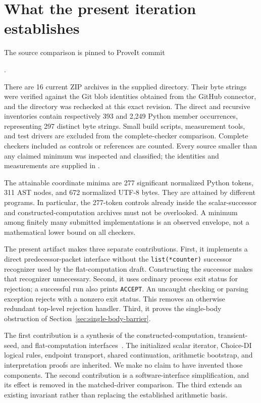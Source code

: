 \section{What the present iteration establishes}

The source comparison is pinned to ProveIt commit
\begin{center}\small
{}.
\end{center}
There are 16 current ZIP archives in the supplied directory. Their byte
strings were verified against the Git blob identities obtained from the
GitHub connector, and the directory was rechecked at this exact revision.
The direct and recursive inventories contain respectively 393 and 2,249
Python member occurrences, representing 297 distinct byte strings.
Small build scripts, measurement tools, and test drivers are excluded from
the complete-checker comparison. Complete checkers included as controls
or references are counted. Every source smaller than any claimed minimum
was inspected and classified; the identities and measurements are supplied
in .

The attainable coordinate minima are 277 significant normalized Python
tokens, 311 AST nodes, and 672 normalized UTF-8 bytes. They are attained
by different programs. In particular, the 277-token controls already
inside the scalar-successor and constructed-computation archives must not
be overlooked. A minimum among finitely many submitted implementations
is an observed envelope, not a mathematical lower bound on all checkers.

The present artifact makes three separate contributions.
First, it implements a direct predecessor-packet interface without the
\texttt{list(*counter)} successor recognizer used by the flat-computation
draft. Constructing the successor makes that recognizer unnecessary.
Second, it uses ordinary process exit status for rejection; a successful
run also prints \texttt{ACCEPT}. An uncaught checking or parsing exception
rejects with a nonzero exit status. This removes an otherwise redundant
top-level rejection handler. Third, it proves the single-body obstruction
of Section~\ref{sec:single-body-barrier}.

The first contribution is a synthesis of the constructed-computation,
transient-seed, and flat-computation interfaces~\cite{constructed,transient,flat}.
The initialized scalar iterator, Choice-DI logical rules, endpoint
transport, shared continuation, arithmetic bootstrap, and interpretation
proofs are inherited. We make no claim to have invented those components.
The second contribution is a software-interface simplification, and its
effect is removed in the matched-driver comparison. The third extends an
existing invariant rather than replacing the established arithmetic basis.

